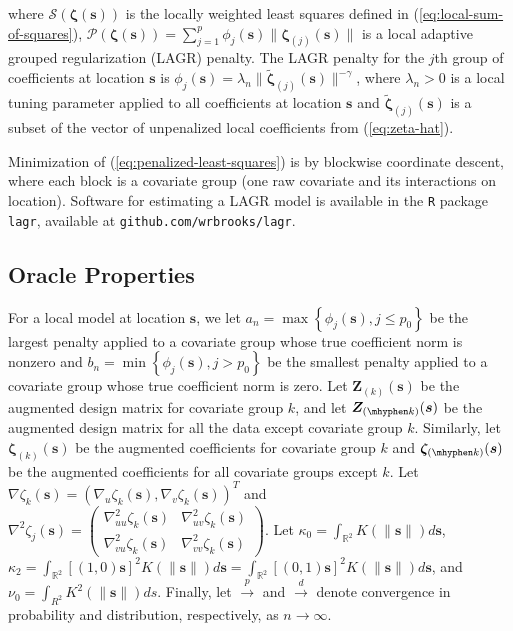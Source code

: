 \documentclass[authoryear,review, 12pt]{elsarticle}
\begin{document}
where $\mathcal{S}\left(\bm{\zeta}\left(\bm{s}\right)\right)$ is
the locally weighted least squares defined in (\ref{eq:local-sum-of-squares}),
$\mathcal{P}\left(\bm{\zeta}(\bm{s})\right)=\sum_{j=1}^{p}\phi_{j}(\bm{s})\|\bm{\zeta}_{(j)}(\bm{s})\|$
is a local adaptive grouped regularization (LAGR) penalty. The LAGR
penalty for the $j$th group of coefficients at location $\bm{s}$
is $\phi_{j}(\bm{s})=\lambda_{n}\|\tilde{\bm{\zeta}}_{(j)}(\bm{s})\|^{-\gamma}$,
where $\lambda_{n}>0$ is a local tuning parameter applied to all
coefficients at location $\bm{s}$ and $\tilde{\bm{\zeta}}_{(j)}(\bm{s})$
is a subset of the vector of unpenalized local coefficients from (\ref{eq:zeta-hat}).

Minimization of (\ref{eq:penalized-least-squares}) is by blockwise
coordinate descent, where each block is a covariate group (one raw
covariate and its interactions on location). Software for estimating
a LAGR model is available in the \texttt{R} package \texttt{lagr},
available at \texttt{github.com/wrbrooks/lagr}.


\subsection{Oracle Properties\label{sub:oracle-properties}}

For a local model at location $\bm{s}$, we let $a_{n}=\max\left\{ \phi_{j}(\bm{s}),j\le p_{0}\right\} $
be the largest penalty applied to a covariate group whose true coefficient
norm is nonzero and $b_{n}=\min\left\{ \phi_{j}(\bm{s}),j>p_{0}\right\} $
be the smallest penalty applied to a covariate group whose true coefficient
norm is zero. Let $\bm{Z}_{(k)}(\bm{s})$ be the augmented design
matrix for covariate group $k$, and let $\bm{Z}_{(\mhyphen k)}(\bm{s})$
be the augmented design matrix for all the data except covariate group
$k$. Similarly, let $\bm{\zeta}_{(k)}(\bm{s})$ be the augmented
coefficients for covariate group $k$ and $\bm{\zeta}_{(\mhyphen k)}(\bm{s})$
be the augmented coefficients for all covariate groups except $k$.
Let $\nabla\zeta_{k}(\bm{s})=\left(\nabla_{u}\zeta_{k}(\bm{s}),\nabla_{v}\zeta_{k}(\bm{s})\right)^{T}$
and $\nabla^{2}\zeta_{j}(\bm{s})=\left(\begin{array}{cc}
\nabla_{uu}^{2}\zeta_{k}(\bm{s}) & \nabla_{uv}^{2}\zeta_{k}(\bm{s})\\
\nabla_{vu}^{2}\zeta_{k}(\bm{s}) & \nabla_{vv}^{2}\zeta_{k}(\bm{s})
\end{array}\right)$. Let $\kappa_{0}=\int_{\mathbb{R}^{2}}K(\|\bm{s}\|)d\bm{s}$, $\kappa_{2}=\int_{\mathbb{R}^{2}}[(1,0)\bm{s}]^{2}K(\|\bm{s}\|)d\bm{s}=\int_{\mathbb{R}^{2}}[(0,1)\bm{s}]^{2}K(\|\bm{s}\|)d\bm{s}$,
and $\nu_{0}=\int_{R^{2}}K^{2}(\|\bm{s}\|)ds$. Finally, let $\xrightarrow{p}$
and $\xrightarrow{d}$ denote convergence in probability and distribution,
respectively, as $n\to\infty$.
\end{document}
